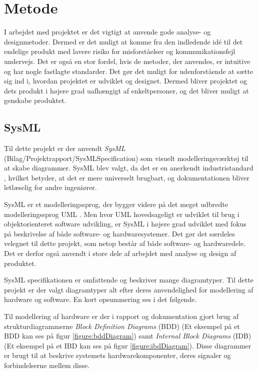 \chapter{Metode}
I arbejdet med projektet er det vigtigt at anvende gode analyse- og designmetoder. Dermed er det muligt at komme fra den indledende idé til det endelige produkt med lavere risiko for misforståelser og kommunikationsfejl undervejs. Det er også en stor fordel, hvis de metoder, der anvendes, er intuitive og har nogle fastlagte standarder. Det gør det muligt for udenforstående at sætte sig ind i, hvordan projektet er udviklet og designet. Dermed bliver projektet og dets produkt i højere grad uafhængigt af enkeltpersoner, og det bliver muligt at genskabe produktet.

\section{SysML}
Til dette projekt er der anvendt \textit{SysML} \cite{sysml} (Bilag/Projektrapport/SysMLSpecification) som visuelt modelleringsværktøj til at skabe diagrammer. SysML blev valgt, da det er en anerkendt industristandard \cite{sysml}, hvilket betyder, at det er mere universelt brugbart, og dokumentationen bliver letlæselig for andre ingeniører. \newline 

\noindent SysML er et modelleringssprog, der bygger videre på det meget udbredte modelleringssprog UML \cite{uml}. Men hvor UML hovedsageligt er udviklet til brug i objektorienteret software udvikling, er SysML i højere grad udviklet med fokus på beskrivelse af både software- og hardwaresystemer. Det gør det særdeles velegnet til dette projekt, som netop består af både software- og hardwaredele. Det er derfor også anvendt i store dele af arbejdet med analyse og design af produktet. \newline

\noindent SysML specifikationen er omfattende og beskriver mange diagramtyper. Til dette projekt er der valgt diagramtyper alt efter deres anvendelighed for modellering af hardware og software. En kort opsummering ses i det følgende. \newline

\noindent Til modellering af hardware er der i rapport og dokumentation gjort brug af strukturdiagrammerne \textit{Block Definition Diagrams} (BDD) (Et eksempel på et BDD kan ses på figur \ref{figure:bddDiagram}) samt \textit{Internal Block Diagrams} (IDB) (Et eksempel på et IBD kan ses på figur \ref{figure:ibdDiagram}). Disse diagrammer er brugt til at beskrive systemets hardwarekomponenter, deres signaler og forbindelserne mellem disse. \newline

